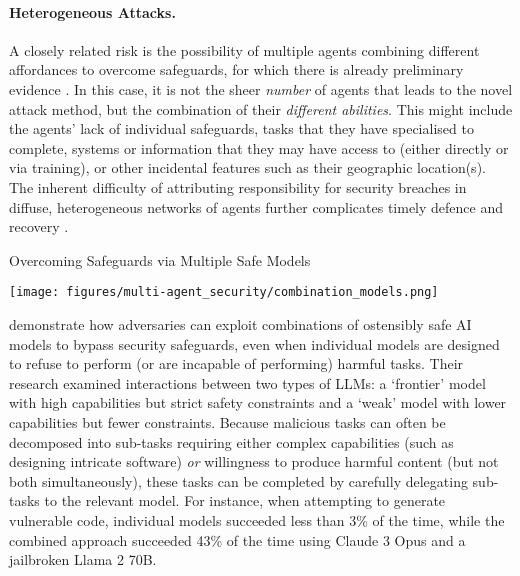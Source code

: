 \paragraph{Heterogeneous Attacks.}
A closely related risk is the possibility of multiple agents {combining different affordances to overcome safeguards}, for which there is already preliminary evidence \citep[see also ]{Jones2024}.
In this case, it is not the sheer \textit{number} of agents that leads to the novel attack method, but the combination of their \textit{different abilities}.
This might include the agents' lack of individual safeguards, tasks that they have specialised to complete, systems or information that they may have access to (either directly or via training), or other incidental features such as their geographic location(s).
The inherent difficulty of attributing responsibility for security breaches in diffuse, heterogeneous networks of agents further complicates timely defence and recovery \citep{skopik_under_2020}.

\begin{case-study}[label=cs:overcoming_safeguards]{Overcoming Safeguards via Multiple Safe Models}
    \begin{center}
        \texttt{[image: figures/multi-agent\_security/combination\_models.png]}
    \end{center}
    \vspace{1em}
\citet{Jones2024} demonstrate how adversaries can exploit combinations of ostensibly safe AI models to bypass security safeguards, even when individual models are designed to refuse to perform (or are incapable of performing) harmful tasks. 
Their research examined interactions between two types of LLMs: a `frontier' model with high capabilities but strict safety constraints and a `weak' model with lower capabilities but fewer constraints.
Because malicious tasks can often be decomposed into sub-tasks requiring either complex capabilities (such as designing intricate software) \textit{or} willingness to produce harmful content (but not both simultaneously), these tasks can be completed by carefully delegating sub-tasks to the relevant model.
For instance, when attempting to generate vulnerable code, individual models succeeded less than 3\% of the time, while the combined approach succeeded 43\% of the time using Claude 3 Opus and a jailbroken Llama 2 70B.
\end{case-study}

